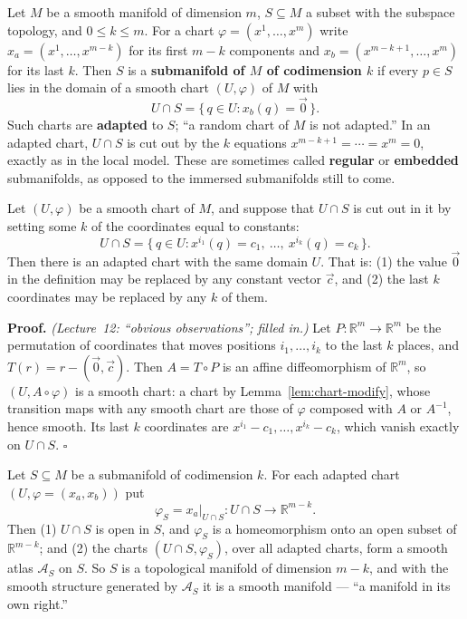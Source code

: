 \documentclass[11pt]{report}
\makeatletter
\newcounter{defcounter}[section]
\newcounter{thmcounter}[section]
\renewenvironment{proof}[1][Proof]{\noindent\textbf{#1.} }{\hfill$\square$\par\vspace{5pt}}
\newcommand{\thmlabel}[1]{\edef\@currentlabel{\arabic{section}.\arabic{thmcounter}}\label{#1}}
\newcommand{\deflabel}[1]{\edef\@currentlabel{\arabic{section}.\arabic{defcounter}}\label{#1}}
\newcommand{\leeref}[1]{\par\smallskip{\raggedleft\footnotesize\textsc{Lee}:\ #1\par}}
\makeatother
\begin{document}
\begin{defbox}\deflabel{def:submanifold}
Let $M$ be a smooth manifold of dimension $m$, $S \subseteq M$ a subset with the subspace topology, and $0 \le k \le m$. For a chart $\varphi = (x^1, \ldots, x^m)$ write $x_a = (x^1, \ldots, x^{m-k})$ for its first $m - k$ components and $x_b = (x^{m-k+1}, \ldots, x^m)$ for its last $k$. Then $S$ is a \textbf{submanifold of $M$ of codimension $k$} if every $p \in S$ lies in the domain of a smooth chart $(U, \varphi)$ of $M$ with
\[
U \cap S = \{\, q \in U : x_b(q) = \vec 0 \,\}.
\]
Such charts are \textbf{adapted} to $S$; ``a random chart of $M$ is not adapted.'' In an adapted chart, $U \cap S$ is cut out by the $k$ equations $x^{m-k+1} = \cdots = x^m = 0$, exactly as in the local model. These are sometimes called \textbf{regular} or \textbf{embedded} submanifolds, as opposed to the immersed submanifolds still to come.
\leeref{Theorem 5.8}
\end{defbox}

\begin{propbox}\thmlabel{prop:adapted-flex}
Let $(U, \varphi)$ be a smooth chart of $M$, and suppose that $U \cap S$ is cut out in it by setting some $k$ of the coordinates equal to constants:
\[
U \cap S = \{\, q \in U : x^{i_1}(q) = c_1, \ \ldots, \ x^{i_k}(q) = c_k \,\}.
\]
Then there is an adapted chart with the same domain $U$. That is: (1) the value $\vec 0$ in the definition may be replaced by any constant vector $\vec c$, and (2) the last $k$ coordinates may be replaced by any $k$ of them.
\end{propbox}

\begin{proof}
\textit{(Lecture~12: ``obvious observations''; filled in.)} Let $P : \mathbb{R}^m \to \mathbb{R}^m$ be the permutation of coordinates that moves positions $i_1, \ldots, i_k$ to the last $k$ places, and $T(r) = r - (\vec 0, \vec c)$. Then $A = T \circ P$ is an affine diffeomorphism of $\mathbb{R}^m$, so $(U, A \circ \varphi)$ is a smooth chart: a chart by Lemma~\ref{lem:chart-modify}, whose transition maps with any smooth chart are those of $\varphi$ composed with $A$ or $A^{-1}$, hence smooth. Its last $k$ coordinates are $x^{i_1} - c_1, \ldots, x^{i_k} - c_k$, which vanish exactly on $U \cap S$.
\end{proof}

\begin{propbox}\thmlabel{prop:submanifold-structure}
Let $S \subseteq M$ be a submanifold of codimension $k$. For each adapted chart $(U, \varphi = (x_a, x_b))$ put
\[
\varphi_S = x_a|_{U \cap S} : U \cap S \longrightarrow \mathbb{R}^{m-k}.
\]
Then (1) $U \cap S$ is open in $S$, and $\varphi_S$ is a homeomorphism onto an open subset of $\mathbb{R}^{m-k}$; and (2) the charts $(U \cap S, \varphi_S)$, over all adapted charts, form a smooth atlas $\mathcal{A}_S$ on $S$. So $S$ is a topological manifold of dimension $m - k$, and with the smooth structure generated by $\mathcal{A}_S$ it is a smooth manifold --- ``a manifold in its own right.''
\leeref{Theorem 5.8}
\end{propbox}
\end{document}
